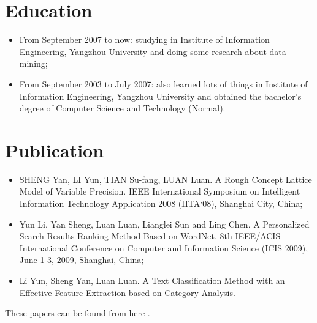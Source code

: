 \documentclass[a4paper,10pt,english]{manual}
\begin{document}
\section{Education}
\begin{itemize}
\item {} 
From September 2007 to now: studying in Institute of Information Engineering, Yangzhou University and doing some research about data mining;

\item {} 
From September 2003 to July 2007: also learned lots of things in Institute of Information Engineering, Yangzhou University and obtained the bachelor's degree of Computer Science and Technology (Normal).

\end{itemize}


\section{Publication}
\begin{itemize}
\item {} 
SHENG Yan, LI Yun, TIAN Su-fang, LUAN Luan. A Rough Concept Lattice Model of Variable Precision. IEEE International Symposium on Intelligent Information Technology Application 2008 (IITA`08), Shanghai City, China;

\item {} 
Yun Li, Yan Sheng, Luan Luan, Lianglei Sun and Ling Chen. A Personalized Search Results Ranking Method Based on WordNet. 8th IEEE/ACIS International Conference on Computer and Information Science (ICIS 2009), June 1-3, 2009, Shanghai, China; 

\item {} 
Li Yun, Sheng Yan, Luan Luan. A Text Classification Method with an Effective Feature Extraction based on Category Analysis. 

\end{itemize}

These papers can be found from \href{http://github.com/lizzie/lizworkspace/tree/cb82ad8d84a1b1a12df80e3508e3629abf09ac83/paper}{here} .
\end{document}
